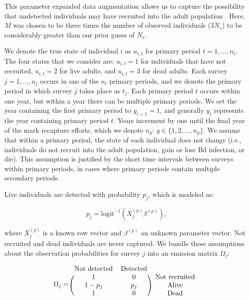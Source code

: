 \documentclass[9pt,twoside,lineno]{pnas-new}
\begin{document}
This parameter expanded data augmentation allows us to capture the
possibility that undetected individuals may have recruited into the
adult population \citep{royle2012}. Here, \(M\) was chosen to be three
times the number of observed individuals (\(3N_s\)) to be considerably
greater than our prior guess of \(N_s\).

We denote the true state of individual \(i\) as \(u_{i, t}\) for primary
period \(t = 1,..., n_t\). The four states that we consider are:
\(u_{i, t} = 1\) for individuals that have not recruited,
\(u_{i, t} =2\) for live adults, and \(u_{i, t} = 3\) for dead adults.
Each survey \(j=1, ..., n_j\) occurs in one of the \(n_t\) primary
periods, and we denote the primary period in which survey \(j\) takes
place as \(t_j\). Each primary period \(t\) occurs within one year, but
within a year there can be multiple primary periods. We set the year
containing the first primary period to \(y_{t = 1} = 1\), and generally
\(y_t\) represents the year containing primary period \(t\). Years
increment by one until the final year of the mark recapture efforts,
which we denote \(n_y\): \(y \in \{1, 2, ..., n_y\}\). We assume that
within a primary period, the state of each individual does not change
(i.e., individuals do not recruit into the adult population, gain or
lose Bd infection, or die). This assumption is justified by the short
time intervals between surveys within primary periods, in cases where
primary periods contain multiple secondary periods.

Live individuals are detected with probability \(p_j\), which is modeled
as:

\[p_j = \text{logit}^{-1}(X_j^{(p)} \beta^{(p)}),\]

where \(X_j^{(p)}\) is a known row vector and \(\beta^{(p)}\) an unknown
parameter vector. Not recruited and dead individuals are never captured.
We bundle these assumptions about the observation probabilities for
survey \(j\) into an emission matrix \(\Omega_j\):

\[
\Omega_j =
\begin{blockarray}{ccc}
  \text{Not detected} & \text{Detected} \\
\begin{block}{(cc)c}
  1 & 0 & \text{Not recruited} \\
  1 - p_j & p_j & \text{Alive} \\
  1 & 0 & \text{Dead} \\
\end{block}
\end{blockarray}
\]
\end{document}
